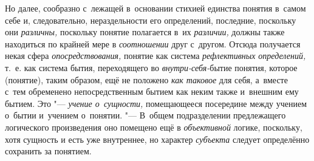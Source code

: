 Но далее, сообразно с~лежащей в~основании стихией единства понятия в~самом
себе и, следовательно, нераздельности его определений, последние, поскольку
они {\em различны,} поскольку понятие полагается в~их
{\em различии,} должны также находиться по крайней мере
в {\em соотношении} друг с~другом. Отсюда получается
некая сфера {\em опосредствования,} понятие как система
{\em рефлективных определений,} т.~е. как система
бытия, переходящего во {\em внутри-себя-}бытие понятия,
которое (понятие), таким образом, ещё не положено
{\em как таковое} для себя, а~вместе с~тем обременено
непосредственным бытием как неким также и~внешним ему бытием. Это
"--- {\em учение о~сущности,} помещающееся посередине
между учением о~бытии и~учением о~понятии. "--- В~общем подразделении
предлежащего логического произведения оно помещено ещё в
{\em объективной} логике, поскольку, хотя сущность и
есть уже внутреннее, но характер {\em субъекта} следует
определённо сохранить за понятием.

